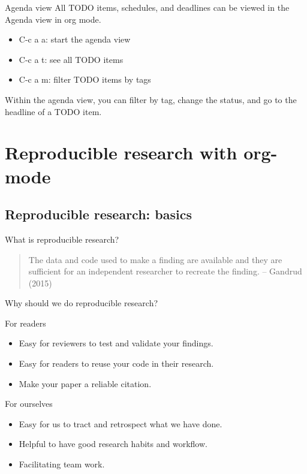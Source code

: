 \documentclass[presentation]{beamer}
\begin{document}
\begin{frame}[label={sec:org3d88727}]{Agenda view}
All TODO items, schedules, and deadlines can be viewed in the Agenda
view in org mode.

\begin{itemize}
\item C-c a a: start the agenda view
\item C-c a t: see all TODO items
\item C-c a m: filter TODO items by tags
\end{itemize}

Within the agenda view, you can filter by tag, change the status, and
go to the headline of a TODO item.
\end{frame}


\section*{Reproducible research with org-mode}
\label{sec:org1ab3179}

\subsection*{Reproducible research: basics}
\label{sec:orgf973b40}

\begin{frame}[label={sec:org532b405}]{What is reproducible research?}
\begin{quote}
The data and code used to make a finding are available and they are
sufficient for an independent researcher to recreate the finding.
-- Gandrud (2015)
\end{quote}
\end{frame}


\begin{frame}[label={sec:org663c9aa}]{Why should we do reproducible research?}
\begin{block}{For readers}
\begin{itemize}
\item Easy for reviewers to test and validate your findings.
\item Easy for readers to reuse your code in their research.
\item Make your paper a reliable citation.
\end{itemize}
\end{block}

\begin{block}{For ourselves}
\begin{itemize}
\item Easy for us to tract and retrospect what we have done.
\item Helpful to have good research habits and workflow.
\item Facilitating team work.
\end{itemize}
\end{block}
\end{frame}
\end{document}
